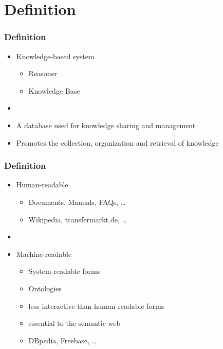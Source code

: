 \section{Definition}

\begin{frame}
\frametitle{Definition}
\begin{itemize}
  \item Knowledge-based system
  \begin{itemize}
    \item Reasoner
    \item Knowledge Base
  \end{itemize}
  \item[]
	\item A database used for knowledge sharing and management
	\item Promotes the collection, organization and retrieval of knowledge
\end{itemize}

\end{frame}

\begin{frame}
\frametitle{Definition}

\begin{itemize}
    \item Human-readable
    \begin{itemize}
      \item Documents, Manuals, FAQs, \ldots
      \item Wikipedia, transfermarkt.de, \ldots
    \end{itemize}
    \item[]
    \item Machine-readable
    \begin{itemize}
      \item System-readable forms
      \item Ontologies
      \item less interactive than human-readable forms
      \item essential to the semantic web
      \item DBpedia, Freebase, \ldots
    \end{itemize}
    
\end{itemize}

\end{frame}